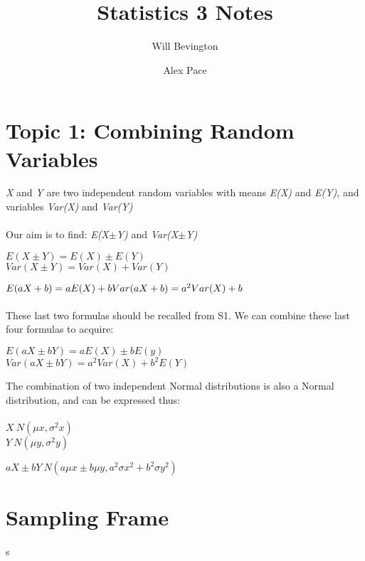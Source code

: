 \documentclass{article}
\title{Statistics 3 Notes}
\author{Will Bevington \and Alex Pace}
\begin{document}
	\maketitle
    \tableofcontents
    \newpage
	\section{Topic 1: Combining Random Variables}
		\textit{X} and \textit{Y} are two independent random variables with means \textit{E(X)} and \textit{E(Y)}, and variables \textit{Var(X)} and \textit{Var(Y)} \\\\ 
        Our aim is to find: \textit{E(X$\pm$Y)} and \textit{Var(X$\pm$Y)} \\
		\begin{center}
        		$E(X\pm Y) = E(X) \pm E(Y) $ \\ $Var(X\pm Y) = Var(X) + Var(Y)$
        	\end{center}
        $E(aX + b) = aE(X) + b \\ Var(aX + b) = a^2Var(X) + b$ \\\\ These last two formulas should be recalled from S1. We can combine these last four formulas to acquire:
        	\begin{center}
			$E(aX\pm bY) = aE(X)\pm bE(y)$ \\ $Var(aX\pm bY) = a^2Var(X)+b^2E(Y)$
		\end{center}
        	The combination of two independent Normal distributions is also a Normal distribution, and can be expressed thus: \\\\
        $X~N(\mu x , \sigma^2x)$ \\ $Y~N(\mu y , \sigma^2 y)$
        	\begin{center}
			$aX\pm bY~N(a\mu x\pm b\mu y , a^2\sigma x^2+b^2\sigma y^2)$
		\end{center}
	\section{Sampling Frame}s
\end{document}
